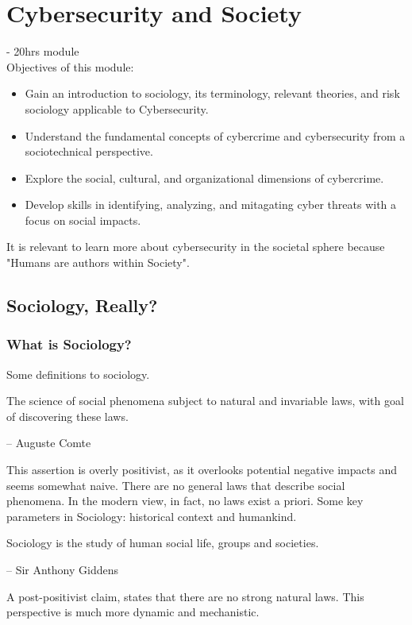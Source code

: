 \chapter{Cybersecurity and Society}
\cite{04_Sociology} - 20hrs module\\
Objectives of this module:
\begin{itemize}
    \item Gain an introduction to sociology, its terminology, relevant theories, and risk sociology applicable to Cybersecurity.
    \item Understand the fundamental concepts of cybercrime and cybersecurity from a sociotechnical perspective.
    \item Explore the social, cultural, and organizational dimensions of cybercrime.
    \item Develop skills in identifying, analyzing, and mitagating cyber threats with a focus on social impacts.
\end{itemize}
It is relevant to learn more about cybersecurity in the societal sphere because "Humans are authors within Society".
\section{Sociology, Really?}
\subsection{What is Sociology?}
Some definitions to sociology.

\begin{displayquote}
    The science of social phenomena subject to natural and invariable laws, with goal of discovering these laws.
\end{displayquote}
\hfill -- Auguste Comte 
\newline

This assertion is overly positivist, as it overlooks potential negative impacts and seems somewhat naive. There are no general laws that describe social phenomena. In the modern view, in fact, no laws exist a priori. Some key parameters in Sociology: historical context and humankind.

\begin{displayquote}
    Sociology is the study of human social life, groups and societies.
\end{displayquote}
\hfill -- Sir Anthony Giddens

A post-positivist claim, states that there are no strong natural laws. This perspective is much more dynamic and mechanistic.

